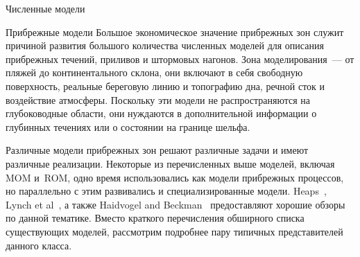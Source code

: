 \begin{chapter}{Численные модели}
\begin{section}{Прибрежные модели}\label{sec:CoastalModels}
Большое экономическое значение прибрежных зон служит причиной развития
большого количества численных моделей для описания прибрежных течений,
приливов и штормовых нагонов. Зона моделирования~--- от пляжей до
континентального склона, они включают в себя свободную поверхность,
реальные береговую линию и топографию дна, речной сток и воздействие
атмосферы. Поскольку эти модели не распространяются на глубоководные
области, они нуждаются в дополнительной информации о глубинных
течениях или о состоянии на границе шельфа.
%

Различные модели прибрежных зон решают различные задачи и имеют
различные реализации. Некоторые из перечисленных выше моделей, включая
MOM и~ROM, одно время использовались как модели прибрежных
процессов, но параллельно с этим развивались и специализированные
модели. Heaps~\cite{Heaps:1987}, Lynch et al~\cite{Lynch:1996}, 
а также Haidvogel and Beckman~\cite{Haidvogel:1998}
предоставляют хорошие обзоры по данной тематике. Вместо краткого перечисления
обширного списка существующих моделей, рассмотрим подробнее пару типичных
представителей данного класса.
%


\end{section}
\end{chapter}
